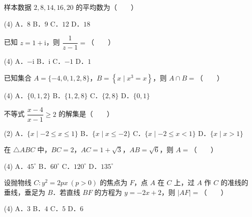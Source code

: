 \begin{question}
样本数据 $2,8,14,16,20$ 的平均数为（　　）

\begin{gkopts}(4)
\task A．$8$
\task B．$9$
\task C．$12$
\task D．$18$
\end{gkopts}

\end{question}
\begin{question}
已知 $z=1+\mathrm{i}$，则 $\dfrac{1}{z-1}=$（　　）

\begin{gkopts}(4)
\task A．$-\mathrm{i}$
\task B．$\mathrm{i}$
\task C．$-1$
\task D．$1$
\end{gkopts}

\end{question}
\begin{question}
已知集合 $A=\{-4,0,1,2,8\}$，$B=\left\{x\mid x^3=x\right\}$，则 $A\cap B=$（　　）

\begin{gkopts}(4)
\task A．$\{0,1,2\}$
\task B．$\{1,2,8\}$
\task C．$\{2,8\}$
\task D．$\{0,1\}$
\end{gkopts}

\end{question}
\begin{question}
不等式 $\dfrac{x-4}{x-1}\ge 2$ 的解集是（　　）

\begin{gkopts}(2)
\task A．$\{x\mid -2\le x\le 1\}$
\task B．$\{x\mid x\le -2\}$
\task C．$\{x\mid -2\le x<1\}$
\task D．$\{x\mid x>1\}$
\end{gkopts}

\end{question}
\begin{question}
在 $\triangle ABC$ 中，$BC=2$，$AC=1+\sqrt3$，$AB=\sqrt6$，则 $A=$（　　）

\begin{gkopts}(4)
\task A．$45^\circ$
\task B．$60^\circ$
\task C．$120^\circ$
\task D．$135^\circ$
\end{gkopts}

\end{question}
\begin{question}
设抛物线 $C:y^2=2px\ (p>0)$ 的焦点为 $F$，点 $A$ 在 $C$ 上，过 $A$ 作 $C$ 的准线的垂线，垂足为 $B$．若直线 $BF$ 的方程为 $y=-2x+2$，则 $|AF|=$（　　）

\begin{gkopts}(4)
\task A．$3$
\task B．$4$
\task C．$5$
\task D．$6$
\end{gkopts}

\end{question}
